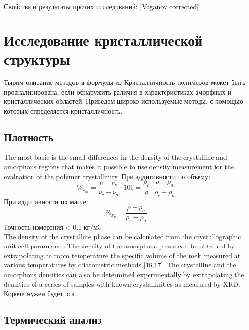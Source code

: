 

	
	
	
	Свойства и результаты прочих исследований:
	[Vaganov corrected]

\section{Исследование кристаллической структуры}

Тырим описание методов и формулы из \cite{cryst3}
Кристалличность полимеров может быть проанализирована, если обнаружить раличия в характеристиках аморфных и кристаллических областей. Приведем широко используемые методы, с помощью которых определяется кристалличность.

\subsection{Плотность}
The most basic is the
small differences in the density of the crystalline and amorphous regions that makes it
possible to use density measurement for the evaluation of the polymer crystallinity.
При аддитивности по объему:
\[
\%_{x_m} =\frac{\nu - \nu_a}{\nu_c - \nu_a}\cdot100 = \frac{\rho_c}{\rho}\cdot\frac{\rho - \rho_a}{\rho_c-\rho_a}
\]
При аддитивности по массе:
\[
\%_{x_{\nu}} =\frac{\rho - \rho_a}{\rho_c-\rho_a}
\]
Точность измерения < 0.1 кг/м3\\
The density of the crystalline phase
can be calculated from the crystallographic unit cell parameters. The density of
the amorphous phase can be obtained by extrapolating to room temperature the specific
volume of the melt measured at various temperatures by dilatometric methods
[16,17]. The crystalline and the amorphous densities can also be determined experimentally
by extrapolating the densities of a series of samples with known crystallinities
as measured by XRD.\\
Короче нужен будет рса

\subsection{Термический анализ}



